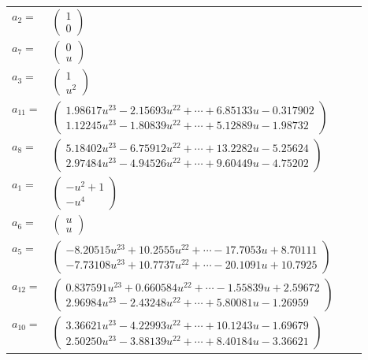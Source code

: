 \documentclass[1p]{elsarticle_modified}
\theoremstyle{definition}
\begin{document}
\begin{tabular}{m{7pt} m{180pt} m{7pt} m{180pt} }
\flushright $a_{2}=$&$\begin{pmatrix}1\\0\end{pmatrix}$ \\
\flushright $a_{7}=$&$\begin{pmatrix}0\\u\end{pmatrix}$ \\
\flushright $a_{3}=$&$\begin{pmatrix}1\\u^2\end{pmatrix}$ \\
\flushright $a_{11}=$&$\begin{pmatrix}1.98617 u^{23}-2.15693 u^{22}+\cdots+6.85133 u-0.317902\\1.12245 u^{23}-1.80839 u^{22}+\cdots+5.12889 u-1.98732\end{pmatrix}$ \\
\flushright $a_{8}=$&$\begin{pmatrix}5.18402 u^{23}-6.75912 u^{22}+\cdots+13.2282 u-5.25624\\2.97484 u^{23}-4.94526 u^{22}+\cdots+9.60449 u-4.75202\end{pmatrix}$ \\
\flushright $a_{1}=$&$\begin{pmatrix}- u^2+1\\- u^4\end{pmatrix}$ \\
\flushright $a_{6}=$&$\begin{pmatrix}u\\u\end{pmatrix}$ \\
\flushright $a_{5}=$&$\begin{pmatrix}-8.20515 u^{23}+10.2555 u^{22}+\cdots-17.7053 u+8.70111\\-7.73108 u^{23}+10.7737 u^{22}+\cdots-20.1091 u+10.7925\end{pmatrix}$ \\
\flushright $a_{12}=$&$\begin{pmatrix}0.837591 u^{23}+0.660584 u^{22}+\cdots-1.55839 u+2.59672\\2.96984 u^{23}-2.43248 u^{22}+\cdots+5.80081 u-1.26959\end{pmatrix}$ \\
\flushright $a_{10}=$&$\begin{pmatrix}3.36621 u^{23}-4.22993 u^{22}+\cdots+10.1243 u-1.69679\\2.50250 u^{23}-3.88139 u^{22}+\cdots+8.40184 u-3.36621\end{pmatrix}$ \\

\end{tabular}
\end{document}
